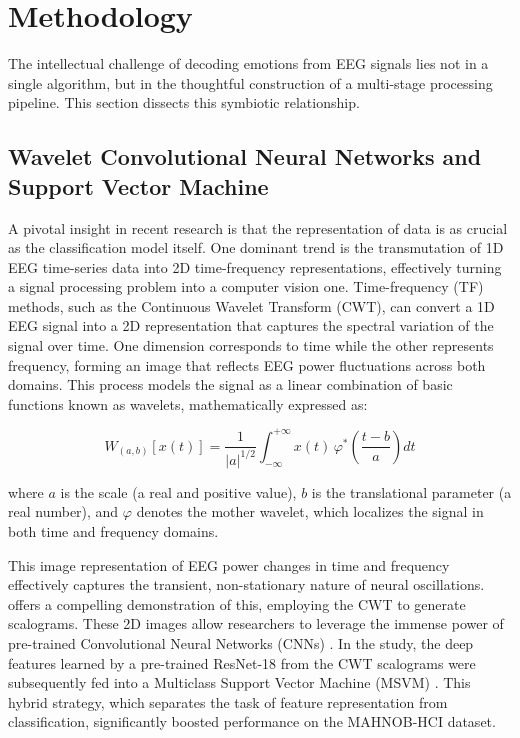 \documentclass[conference]{IEEEtran}
\begin{document}
\section{Methodology}
The intellectual challenge of decoding emotions from EEG signals lies not in a single algorithm, but in the thoughtful construction of a multi-stage processing pipeline. This section dissects this symbiotic relationship.

\subsection{Wavelet Convolutional Neural Networks and Support Vector Machine}
A pivotal insight in recent research is that the representation of data is as crucial as the classification model itself. One dominant trend is the transmutation of 1D EEG time-series data into 2D time-frequency representations, effectively turning a signal processing problem into a computer vision one. Time-frequency (TF) methods, such as the Continuous Wavelet Transform (CWT), can convert a 1D EEG signal into a 2D representation that captures the spectral variation of the signal over time. One dimension corresponds to time while the other represents frequency, forming an image that reflects EEG power fluctuations across both domains. This process models the signal as a linear combination of basic functions known as wavelets, mathematically expressed as:

\begin{equation}
W_{(a,b)}[x(t)] = \frac{1}{|a|^{1/2}} \int_{-\infty}^{+\infty} x(t)\,\varphi^{*}\!\left(\frac{t - b}{a}\right) dt
\end{equation}

where \(a\) is the scale (a real and positive value), \(b\) is the translational parameter (a real number), and \(\varphi\) denotes the mother wavelet, which localizes the signal in both time and frequency domains.

This image representation of EEG power changes in time and frequency effectively captures the transient, non-stationary nature of neural oscillations. \cite{b1} offers a compelling demonstration of this, employing the CWT to generate scalograms. These 2D images allow researchers to leverage the immense power of pre-trained Convolutional Neural Networks (CNNs) \cite{b1}. In the study, the deep features learned by a pre-trained ResNet-18 from the CWT scalograms were subsequently fed into a Multiclass Support Vector Machine (MSVM) \cite{b1}. This hybrid strategy, which separates the task of feature representation from classification, significantly boosted performance on the MAHNOB-HCI dataset.
\end{document}
